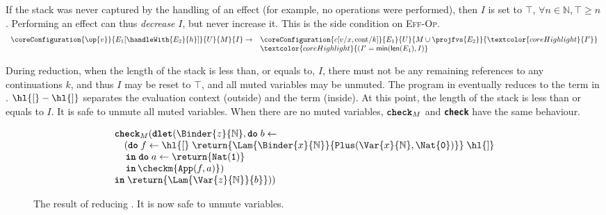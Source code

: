 If the stack was never captured by the handling of an effect (for example, no operations were performed), then $I$ is set to $\top$, $\forall n \in \mathbb{N}, \top \geq n$. Performing an effect can thus \textit{decrease} $I$, but never increase it. This is the side condition on \textsc{Eff-Op}.
\[\begin{array}{ll}\coreConfiguration{\op{v}}{E_1[\handleWith{E_2}{h}]}{U}{M}{I} \to & \coreConfiguration{c[v/x, \text{cont}/ k]}{E_1}{U}{{M \cup \projfvs{E_2}}}{\textcolor{coreHighlight}{I'}} \\ &\textcolor{coreHighlight}{(I' = \textsf{min}(\textsf{len}(E_1), I)} \end{array}\]

During reduction, when the length of the stack is less than, or equals to, $I$, there must not be any remaining references to any continuations $k$, and thus $I$ may be reset to $\top$, and all muted variables may be unmuted. The program in  eventually reduces to the term in . $\hl{[}-\hl{]}$ separates the evaluation context (outside) and the term (inside). At this point, the length of the stack is less than or equals to $I$. It is safe to unmute all muted variables. When there are no muted variables, $\textbf{\texttt{check}}_M$ and \textbf{\texttt{check}} have the same behaviour.
\begin{figure}[H]
\[\begin{array}{l}
  \textbf{\texttt{check}}_M(\textbf{\texttt{dlet}}(\Binder{z}{\mathbb{N}}, \textbf{\texttt{do}} \; b \leftarrow \, \\ 
  \quad (\textbf{\texttt{do}} \; f \leftarrow \hl{[}\; \return{\Lam{\Binder{x}{\mathbb{N}}}{\texttt{Plus}(\Var{x}{\mathbb{N}}, \Nat{\texttt{0}})}}\; \hl{]} \\ 
  \, \quad \textbf{\texttt{in}} \; \textbf{\texttt{do}} \; {a}\leftarrow {\return{\texttt{Nat}(\texttt{1})}}\\
  \, \quad \textbf{\texttt{in}} \, {\checkm{\texttt{App}(f, a)}})\; \\
  \textbf{\texttt{in}} \; \return{\Lam{\Var{z}{\mathbb{N}}}{b}})) 
\end{array}\]
\caption{The result of reducing . It is now safe to unmute variables.}
\label{fig:core-unmute-example-result}
\end{figure}

